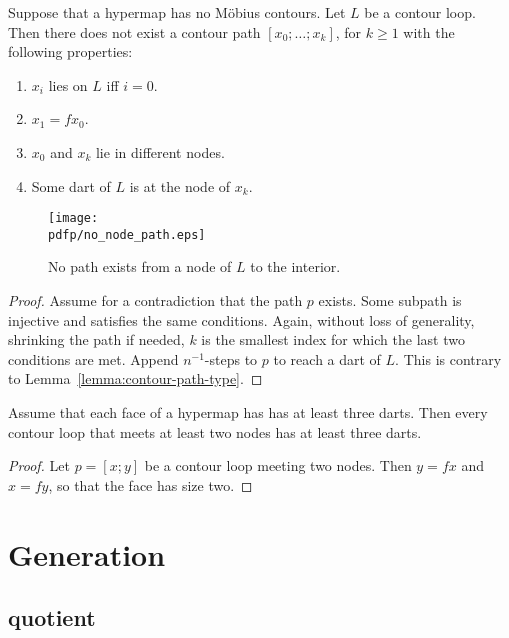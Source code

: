 \begin{lemma}
Suppose that a hypermap has no M\"obius contours.  Let $L$ be a contour loop.
Then there does not exist a contour path
$[x_0;\ldots;x_k]$, for $k\ge 1$ with the following properties:
\begin{enumerate}
\item $x_i$ lies on $L$ iff $i=0$.
\item $x_1 = f x_0$.
\item $x_0$ and $x_k$ lie in different nodes.
\item Some dart of $L$ is at the node of $x_k$.
\end{enumerate}
\end{lemma}

\begin{figure}[htb]
  \centering
  \texttt{[image: \\pdfp/no\_node\_path.eps]}
  \caption{No path exists from a node of $L$ to the interior.}
  \label{fig:no-node-path}
\end{figure}

\begin{proof}  Assume for a contradiction that the path $p$ exists.  Some subpath is injective and satisfies the same conditions.  Again, without loss of generality, shrinking the path if needed, $k$ is the smallest index for which the last two conditions are met.  Append $n^{-1}$-steps to $p$ to reach a dart of $L$.  This is contrary to Lemma~\ref{lemma:contour-path-type}.
\end{proof}

\begin{lemma}\label{lemma:3dart}  
Assume that each face of a hypermap has has at least three darts.  Then every contour loop that meets at least two nodes has at least three darts.
\end{lemma}

\begin{proof}  Let $p=[x;y]$ be a contour loop meeting  two nodes.  Then $y = f x$ and $x = f y$, so that the face has size two.
\end{proof}

\section{Generation}

\subsection{quotient}


